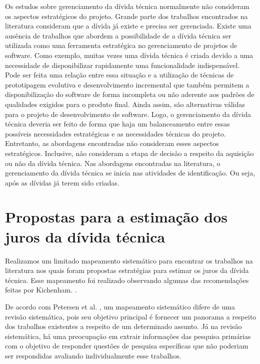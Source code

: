 Os estudos sobre gerenciamento da dívida técnica normalmente não consideram os aspectos estratégicos do projeto. Grande parte dos trabalhos encontrados na literatura consideram que a dívida já existe e precisa ser gerenciada. Existe uma ausência de trabalhos que abordem a possibilidade de a dívida técnica ser utilizada como uma ferramenta  estratégica no gerenciamento de projetos de software. Como exemplo, muitas vezes uma dívida técnica é criada devido a uma necessidade  de disponibilizar rapidamente uma funcionalidade indispensável.  Pode ser feita uma relação entre essa situação e a utilização de técnicas de prototipagem evolutiva e desenvolvimento incremental que também permitem a disponibilização do software de forma incompleta ou não aderente aos padrões de qualidades exigidos para o produto final. Ainda assim,   são alternativas válidas para o projeto de desenvolvimento de software.  Logo, o gerenciamento da dívida técnica deveria ser feito de forma que haja um balanceamento entre essas possíveis  necessidades estratégicas e as necessidades técnicas do projeto. Entretanto, as abordagens encontradas não consideram esses aspectos estratégicos. Inclusive, não consideram a etapa de decisão a respeito da aquisição ou não da dívida técnica. Nas abordagens encontradas na literatura\cite{seaman2011measuring,guo2011portfolio,fernandez2015analysis}, o gerenciamento da dívida técnica se inicia nas atividades de identificação. Ou seja, após as dívidas já terem sido criadas. 


\section{Propostas para a estimação dos juros da dívida técnica}
\label{mapeamento_sistematico}

Realizamos um limitado mapeamento sistemático para encontrar os trabalhos na literatura nos quais foram propostas estratégias para estimar os juros da dívida técnica. Esse mapeamento foi realizado observando algumas das recomendações feitas por Kichenham. \cite{kitchenham2004procedures}.

 De acordo com Petersen et al. \cite{petersen2008systematic}, um mapeamento sistemático difere de uma revisão sistemática, pois seu objetivo principal é fornecer um panorama a respeito dos  trabalhos existentes a respeito de um determinado assunto. Já na revisão sistemática, há uma preocupação em extrair informações das pesquisa primárias com o objetivo de responder questões de pesquisa específicas que não poderiam ser respondidas avaliando individualmente esse trabalhos. 


